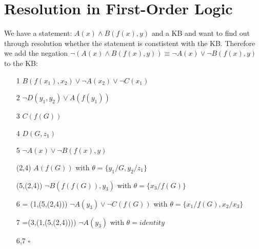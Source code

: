 \documentclass[a4paper]{article}
\begin{document}
\section{Resolution in First-Order Logic}
We have a statement: $A(x) \land B(f(x), y)$ and a KB and want to find out through resolution whether the statement is constistent with the KB. Therefore we add the negation $\neg (A(x) \land B(f(x),y)) \equiv \neg A(x) \lor \neg B(f(x),y)$ to the KB:
\begin{itemize}
	\item[1] $B(f(x_1), x_2) \lor \neg A(x_2) \lor \neg C(x_1)$
	\item[2] $\neg D(y_1, y_2) \lor A(f(y_1))$
	\item[3] $C(f(G))$
	\item[4] $D(G,z_1)$
	\item[5] $\neg A(x) \lor \neg B(f(x),y)$
	\item[(2,4)] $A(f(G))$ with $\theta = \{y_1/G, y_2/z_1\}$
	\item[(5,(2,4))] $\neg B(f(f(G)), y_3)$ with $\theta = \{x_3/f(G)\}$
	\item[6 = (1,(5,(2,4)))] $\neg A(y_3) \lor \neg C(f(G))$ with $\theta = \{x_1/f(G), x_2/x_3 \}$
	\item[7 =(3,(1,(5,(2,4))))]$\neg A(y_3)$ with $\theta = identity$
	\item[6,7] $\square$
\end{itemize}
\end{document}
